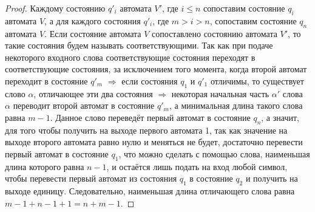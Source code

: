 \documentclass[a4paper, 12pt]{article}
\theoremstyle{definition}
\theoremstyle{plain}
\theoremstyle{remark}
\begin{document}
\begin{proof}
    Каждому состоянию $q'_i$ автомата $V'$, где $i\leqslant n$ сопоставим состояние $q_i$ автомата $V$, а для каждого состояния $q'_i$, где $m> i>n$, сопоставим состояние $q_n$ автомата $V$. Если состояние автомата $V$ сопоставлено состоянию автомата $V'$, то такие состояния будем называть соответствующими. Так как при подаче некоторого входного слова соответствующие состояния переходят в соответствующие состояния, за исключением того момента, когда второй автомат переходит в состояние $q'_m$ $\Longrightarrow$ если состояния $q_1$ и $q'_1$ отличимы, то существует слово $\alpha$, отличающее эти два состояния $\Longrightarrow$ некоторая начальная часть $\alpha'$ слова $\alpha$ переводит второй автомат в состояние $q'_m$, а минимальная длина такого слова равна $m-1$. Данное слово переведёт первый автомат в состояние $q_n$, а значит, для того чтобы получить на выходе первого автомата 1, так как значение на выходе второго автомата равно нулю и меняться не будет, достаточно перевести первый автомат в состояние $q_1$, что можно сделать с помощью слова, наименьшая длина которого равна $n-1$, и остаётся лишь подать на вход любой символ, чтобы перевести первый автомат из состояния $q_1$ в состояние $q_2$ и получить на выходе единицу. Следовательно, наименьшая длина отличающего слова равна $m-1+n-1+1=n+m-1$.
  \end{proof}
\end{document}
